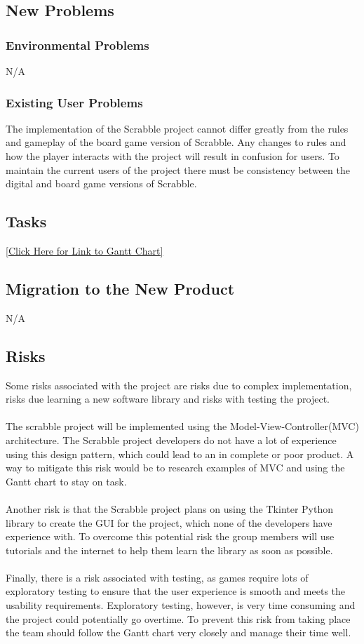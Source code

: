 \documentclass[12pt, titlepage]{article}
\begin{document}
\subsection{New Problems}
\subsubsection{Environmental Problems}
N/A
\subsubsection{Existing User Problems}
The implementation of the Scrabble project cannot differ greatly from the rules and gameplay of the board game version of Scrabble. Any changes to rules and how the player interacts with the project will result in confusion for users. To maintain the current users of the project there must be consistency between the digital and board game versions of Scrabble. 

\subsection{Tasks} %

\href{https://gitlab.cas.mcmaster.ca/choudhrk/thetrifecta_scrabble/blob/master/ProjectSchedule/3XA3\%20Gantt\%20Chart.pdf}{[Click Here for Link to Gantt Chart]}

\subsection{Migration to the New Product} %
N/A

\subsection{Risks} %
Some risks associated with the project are risks due to complex implementation, risks due learning a new software library and risks with testing the project.\\ \\
The scrabble project will be implemented using the Model-View-Controller(MVC) architecture. The Scrabble project developers do not have a lot of experience using this design pattern, which could lead to an in complete or poor product. A way to mitigate this risk would be to research examples of MVC and using the Gantt chart to stay on task.\\ \\
Another risk is that the Scrabble project plans on using the Tkinter Python library to create the GUI for the project, which none of the developers have experience with. To overcome this potential risk the group members will use tutorials and the internet to help them learn the library as soon as possible.\\ \\
Finally, there is a risk associated with testing, as games require lots of exploratory testing to ensure that the user experience is smooth and meets the usability requirements. Exploratory testing, however, is very time consuming and the project could potentially go overtime. To prevent this risk from taking place the team should follow the Gantt chart very closely and manage their time well.
\end{document}
